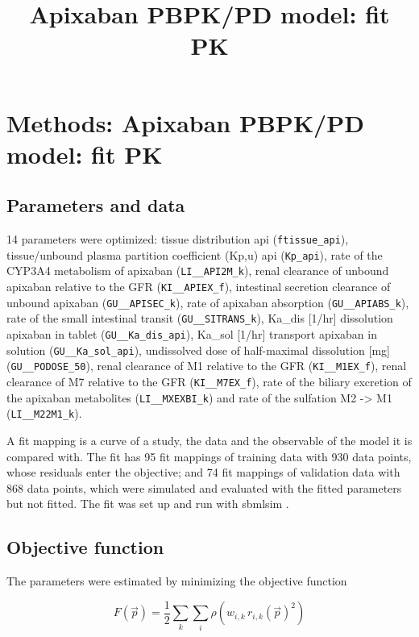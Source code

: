 \documentclass{article}
\title{Apixaban PBPK/PD model: fit PK}
\date{}
\begin{document}
\maketitle

\section{Methods: Apixaban PBPK/PD model: fit PK}

\subsection{Parameters and data}

14 parameters were optimized: tissue distribution api (\texttt{ftissue\_api}), tissue/unbound plasma partition coefficient (Kp,u) api (\texttt{Kp\_api}), rate of the CYP3A4 metabolism of apixaban (\texttt{LI\_\_API2M\_k}), renal clearance of unbound apixaban relative to the GFR (\texttt{KI\_\_APIEX\_f}), intestinal secretion clearance of unbound apixaban (\texttt{GU\_\_APISEC\_k}), rate of apixaban absorption (\texttt{GU\_\_APIABS\_k}), rate of the small intestinal transit (\texttt{GU\_\_SITRANS\_k}), Ka\_dis [1/hr] dissolution apixaban in tablet (\texttt{GU\_\_Ka\_dis\_api}), Ka\_sol [1/hr] transport apixaban in solution (\texttt{GU\_\_Ka\_sol\_api}), undissolved dose of half-maximal dissolution [mg] (\texttt{GU\_\_PODOSE\_50}), renal clearance of M1 relative to the GFR (\texttt{KI\_\_M1EX\_f}), renal clearance of M7 relative to the GFR (\texttt{KI\_\_M7EX\_f}), rate of the biliary excretion of the apixaban metabolites (\texttt{LI\_\_MXEXBI\_k}) and rate of the sulfation M2 -> M1 (\texttt{LI\_\_M22M1\_k}).

A fit mapping is a curve of a study, the data and the observable of the model it is compared with. The fit has 95 fit mappings of training data with 930 data points, whose residuals enter the objective; and 74 fit mappings of validation data with 868 data points, which were simulated and evaluated with the fitted parameters but not fitted. The fit was set up and run with sbmlsim \cite{Koenig2026_sbmlsim}.

\subsection{Objective function}

The parameters were estimated by minimizing the objective function

\begin{equation}
F(\vec{p}) = \frac{1}{2} \sum_{k} \sum_{i} \rho\left(w_{i,k}\, r_{i,k}(\vec{p})^2\right)
\end{equation}
\end{document}
